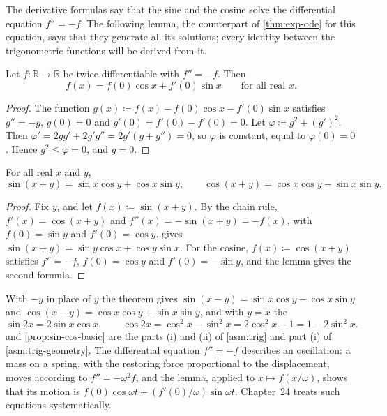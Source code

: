 The derivative formulas say that the sine and the cosine solve the differential equation $f''=-f$. The following lemma, the counterpart of \cref{thm:exp-ode} for this equation, says that they generate all its solutions; every identity between the trigonometric functions will be derived from it.

\begin{lemma}
\label{lem:harmonic-unique}
Let $f\colon\mathbb R\to\mathbb R$ be twice differentiable with $f''=-f$. Then
\[
f(x)=f(0)\cos x+f'(0)\sin x\qquad\text{for all real }x .
\]
\end{lemma}

\begin{proof}
The function $g(x)\coloneqq f(x)-f(0)\cos x-f'(0)\sin x$ satisfies $g''=-g$, $g(0)=0$ and $g'(0)=f'(0)-f'(0)=0$. Let $\varphi\coloneqq g^2+(g')^2$. Then $\varphi'=2gg'+2g'g''=2g'(g+g'')=0$, so $\varphi$ is constant, equal to $\varphi(0)=0$. Hence $g^2\le\varphi=0$, and $g=0$.
\end{proof}

\begin{theorem}
\label{thm:addition}
For all real $x$ and $y$,
\[
\sin(x+y)=\sin x\cos y+\cos x\sin y,\qquad\cos(x+y)=\cos x\cos y-\sin x\sin y .
\]
\end{theorem}

\begin{proof}
Fix $y$, and let $f(x)\coloneqq\sin(x+y)$. By the chain rule, $f'(x)=\cos(x+y)$ and $f''(x)=-\sin(x+y)=-f(x)$, with $f(0)=\sin y$ and $f'(0)=\cos y$.  gives $\sin(x+y)=\sin y\cos x+\cos y\sin x$. For the cosine, $f(x)\coloneqq\cos(x+y)$ satisfies $f''=-f$, $f(0)=\cos y$ and $f'(0)=-\sin y$, and the lemma gives the second formula.
\end{proof}

With $-y$ in place of $y$ the theorem gives $\sin(x-y)=\sin x\cos y-\cos x\sin y$ and $\cos(x-y)=\cos x\cos y+\sin x\sin y$, and with $y=x$ the 
\[
\sin2x=2\sin x\cos x,\qquad\cos2x=\cos^2x-\sin^2x=2\cos^2x-1=1-2\sin^2x .
\]
 and \cref{prop:sin-cos-basic} are the parts (i) and (ii) of \cref{asm:trig} and part (i) of \cref{asm:trig-geometry}. The differential equation $f''=-f$ describes an oscillation: a mass on a spring, with the restoring force proportional to the displacement, moves according to $f''=-\omega^2f$, and the lemma, applied to $x\mapsto f(x/\omega)$, shows that its motion is $f(0)\cos\omega t+(f'(0)/\omega)\sin\omega t$. Chapter~24 treats such equations systematically.

